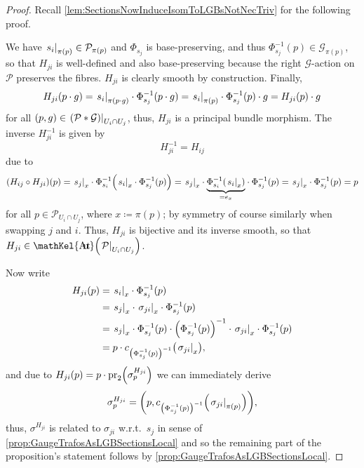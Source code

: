 \documentclass[reqno,a4paper,oneside]{amsart}
\theoremstyle{plain}
\theoremstyle{remark}
\theoremstyle{definition}
\DeclareMathOperator{\sAut}{\mathKel{A\mkern-5.5mu u\mkern-4mu t\mkern-1.5mu}}
\begin{document}
\begin{proof}
\leavevmode\newline
Recall \ref{lem:SectionsNowInduceIsomToLGBsNotNecTriv} for the following proof.

We have $\mleft.s_i\mright|_{\pi(p)} \in \mathcal{P}_{\pi(p)}$ and $\Phi_{s_j}$ is base-preserving, and thus $\Phi_{s_j}^{-1}(p) \in \mathcal{G}_{\pi(p)}$, so that $H_{ji}$ is well-defined and also base-preserving because the right $\mathcal{G}$-action on $\mathcal{P}$ preserves the fibres.
$H_{ji}$ is clearly smooth by construction. Finally, 
\begin{equation*}
H_{ji}(p \cdot g)
=
\mleft.s_i\mright|_{\pi(p\cdot g)} \cdot \Phi_{s_j}^{-1}(p \cdot g)
=
\mleft.s_i\mright|_{\pi(p)} \cdot \Phi_{s_j}^{-1}(p) \cdot g
=
H_{ji}(p) \cdot g
\end{equation*}
for all $(p, g) \in \mleft.\mleft( \mathcal{P} * \mathcal{G} \mright)\mright|_{U_i \cap U_j}$, thus, $H_{ji}$ is a principal bundle morphism. The inverse $H^{-1}_{ji}$ is given by
\begin{equation*}
H^{-1}_{ji}
=
H_{ij}
\end{equation*}
due to
\begin{equation*}
\mleft(H_{ij} \circ H_{ji}\mright)(p)
=
\mleft.s_j\mright|_x \cdot \Phi^{-1}_{s_i}\mleft( \mleft.s_i\mright|_{x} \cdot \Phi_{s_j}^{-1}(p) \mright)
=
\mleft.s_j\mright|_x \cdot {\underbrace{\Phi^{-1}_{s_i}\mleft( \mleft.s_i\mright|_{x} \mright)}_{= e_x}} \cdot \Phi_{s_j}^{-1}(p)
=
\mleft.s_j\mright|_x \cdot \Phi_{s_j}^{-1}(p)
=
p
\end{equation*}
for all $p \in \mathcal{P}_{U_i \cap U_j}$, where $x \coloneqq \pi(p)$; by symmetry of course similarly when swapping $j$ and $i$. Thus, $H_{ji}$ is bijective and its inverse smooth, so that $H_{ji} \in \sAut\mleft( \mleft.\mathcal{P}\mright|_{U_i \cap U_j} \mright)$.

Now write
\begin{align*}
H_{ji}(p)
&=
\mleft.s_i\mright|_{x} \cdot \Phi_{s_j}^{-1}(p)
\\
&=
\mleft.s_j\mright|_{x} \cdot \mleft.\sigma_{ji}\mright|_x \cdot \Phi_{s_j}^{-1}(p)
\\
&=
\mleft.s_j\mright|_{x} \cdot \Phi_{s_j}^{-1}(p) \cdot \mleft( \Phi_{s_j}^{-1}(p) \mright)^{-1} \cdot \mleft.\sigma_{ji}\mright|_x \cdot \Phi_{s_j}^{-1}(p)
\\
&=
p \cdot c_{\mleft(\Phi^{-1}_{s_j}(p)\mright)^{-1}} \mleft( \mleft.\sigma_{ji}\mright|_{x} \mright),
\end{align*}
and due to $H_{ji}(p) = p \cdot \mathrm{pr}_2\mleft(\sigma^{H_{ji}}_p\mright)$ we can immediately derive
\begin{equation*}
\sigma^{H_{ji}}_p
=
\mleft(p, c_{\mleft(\Phi^{-1}_{s_j}(p)\mright)^{-1}} \mleft( \mleft.\sigma_{ji}\mright|_{\pi(p)} \mright) \mright),
\end{equation*}
thus, $\sigma^{H_{ji}}$ is related to $\sigma_{ji}$ w.r.t.\ $s_j$ in sense of \ref{prop:GaugeTrafosAsLGBSectionsLocal} and so the remaining part of the proposition's statement follows by \ref{prop:GaugeTrafosAsLGBSectionsLocal}.
\end{proof}
\end{document}
